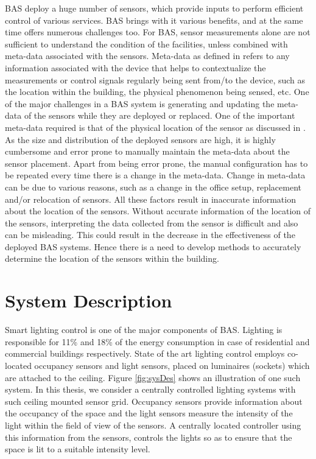 BAS deploy a huge number of sensors, which provide inputs to perform efficient control of various services. BAS brings with it various benefits, and at the same time offers numerous challenges too. For BAS, sensor measurements alone are not sufficient to understand the condition of the facilities, unless combined with meta-data associated with the sensors.
Meta-data as defined in \cite{gao2015data} refers to any information associated  with the device that helps to contextualize the measurements or control signals regularly being sent from/to the device, such as the location within the building, the physical phenomenon being sensed, etc. One of the major challenges in a BAS system is generating and updating the meta-data of the sensors while they are deployed or replaced.
One of the important meta-data required is that of the physical location of the sensor as discussed in \cite{liu2009requirements}.
As the size and distribution of the deployed sensors are high, it is highly cumbersome and error prone to manually maintain the meta-data about the sensor placement. Apart from being error prone, the manual configuration has to be repeated every time there is a change in the meta-data. Change in meta-data can be due to various reasons, such as a change in the office setup, replacement and/or relocation of sensors. All these factors result in inaccurate information about the location of the sensors. Without accurate information of the location of the sensors, interpreting the data collected from the sensor is difficult and also can be misleading. This could result in the decrease in the effectiveness of the deployed BAS systems. Hence there is a need to develop methods to accurately determine the location of the sensors within the building.
\section{System Description}
Smart lighting control is one of the major components of BAS. Lighting is responsible for 11\%  and 18\% of the energy consumption in case of residential and commercial buildings respectively\cite{website}. 
State of the art lighting control employs co-located occupancy sensors and light sensors, placed on luminaires (sockets) which are attached to the ceiling\cite{pandharipande2015smart,caicedo2016smart,van2014distributed}. Figure \ref{fig:sysDes} shows an illustration of one such system. In this thesis, we consider a centrally controlled lighting systems with such ceiling mounted sensor grid. Occupancy sensors provide information about the occupancy of the space and the light sensors measure the intensity of the light within the field of view of the sensors. A centrally located controller using this information from the sensors, controls the lights so as to ensure that the space is lit to a suitable intensity level.

